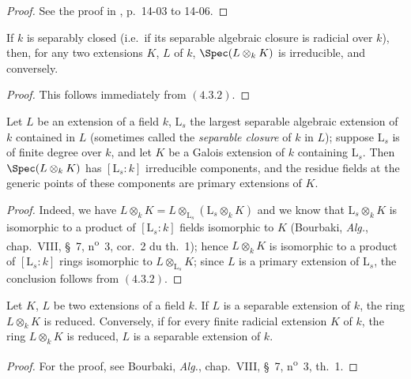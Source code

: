 \begin{proof}
See the proof in \cite{I}, p.~14-03 to 14-06.
\end{proof}

\begin{corollary}[4.3.3]
\label{IV.4.3.3}
If $k$ is separably closed (i.e.\ if its separable algebraic closure is radicial over $k$), then, for any two extensions $K$, $L$ of $k$, $\Spec(L\otimes_k K)$ is irreducible, and conversely.
\end{corollary}

\begin{proof}
This follows immediately from $(4.3.2)$.
\end{proof}

\begin{corollary}[4.3.4]
\label{IV.4.3.4}
Let $L$ be an extension of a field $k$, $\mathrm{L}_s$ the largest separable algebraic extension of $k$ contained in $L$ (sometimes called the \emph{separable closure} of $k$ in $L$); suppose $\mathrm{L}_s$ is of finite degree over $k$, and let $K$ be a Galois extension of $k$ containing $\mathrm{L}_s$.
Then $\Spec(L\otimes_k K)$ has $[\mathrm{L}_s:k]$ irreducible components, and the residue fields at the generic points of these components are primary extensions of $K$.
\end{corollary}

\begin{proof}
Indeed, we have $L\otimes_k K = L\otimes_{\mathrm{L}_s}(\mathrm{L}_s\otimes_k K)$ and we know that $\mathrm{L}_s\otimes_k K$ is isomorphic to a product of $[\mathrm{L}_s:k]$ fields isomorphic to $K$ (Bourbaki, \emph{Alg.}, chap.~VIII, \S~7, n\textsuperscript{o}~3, cor.~2 du th.~1); hence $L\otimes_k K$ is isomorphic to a product of $[\mathrm{L}_s:k]$ rings isomorphic to $L\otimes_{\mathrm{L}_s} K$; since $L$ is a primary extension of $\mathrm{L}_s$, the conclusion follows from $(4.3.2)$.
\end{proof}

\begin{proposition}[4.3.5]
\label{IV.4.3.5}
Let $K$, $L$ be two extensions of a field $k$.
If $L$ is a separable extension of $k$, the ring $L\otimes_k K$ is reduced.
Conversely, if for every finite radicial extension $K$ of $k$, the ring $L\otimes_k K$ is reduced, $L$ is a separable extension of $k$.
\end{proposition}

\begin{proof}
For the proof, see Bourbaki, \emph{Alg.}, chap.~VIII, \S~7, n\textsuperscript{o}~3, th.~1.
\end{proof}

